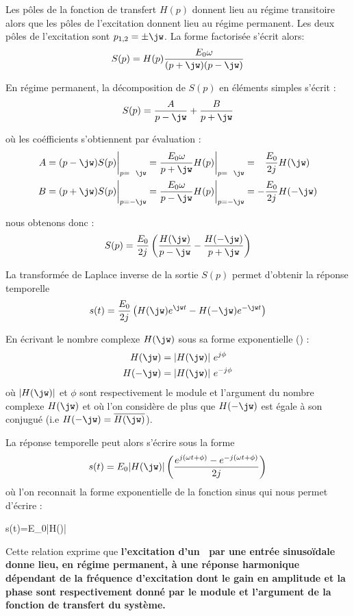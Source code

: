 Les pôles de la fonction de transfert $H(p)$ donnent lieu au 
régime transitoire alors que les pôles de l'excitation donnent 
lieu au régime permanent. 
Les deux pôles de l'excitation sont $p_{1,2}=\pm\jw$. La forme factorisée s'écrit alors:
$$
S(p)=H(p)\dfrac{E_0\omega}{(p+\jw)(p-\jw)}
$$

En régime permanent, la décomposition de $S(p)$ en éléments simples s'écrit :
$$
S(p)=\dfrac{A}{p-\jw} + \dfrac{B}{p+\jw}
$$

où les coéfficients s'obtiennent par évaluation :
\begin{align*}
    A&=(p-\jw)S(p)\bigg|_{p=\hphantom{-}\jw} =\dfrac{E_0\omega}{p+\jw}H(p)\bigg|_{p=\hphantom{-}\jw} =\hphantom{-}\dfrac{E_0}{2j}H(\jw)\\
    B&=(p+\jw)S(p)\bigg|_{p=-\jw}=\dfrac{E_0\omega}{p-\jw}H(p)\bigg|_{p=-\jw}=-\dfrac{E_0}{2j}H(-\jw)
\end{align*}

nous obtenons donc :
$$
S(p)=\dfrac{E_0}{2j}\left(\dfrac{H(\jw)}{p-\jw}-\dfrac{H(-\jw)}{p+\jw} \right)
$$

La transformée de Laplace inverse de la sortie $S(p)$ permet d'obtenir la réponse temporelle 
$$
s(t)=\dfrac{E_0}{2j}\left(H(\jw)e^{\jw t}-H(-\jw)e^{-\jw t}\right)
$$

En écrivant le nombre complexe $H(\jw)$ sous sa forme exponentielle () :
\begin{align*}
    H(\jw)  &= |H(\jw)| e^{j\phi} \\
    H(-\jw) &= |H(\jw)| e^{-j\phi}
\end{align*}
où $|H(\jw)|$ et $\phi$ sont respectivement le module et l'argument du nombre complexe $H(\jw)$ 
et où l'on considère de plus que $H(-\jw)$ est égale à son conjugué (i.e $H(-\jw)=\overline{H(\jw)}$).

La réponse temporelle peut alors s'écrire sous la forme 
\begin{align*}
    s(t)=E_0|H(\jw)|\left(\dfrac{e^{j(\omega t+\phi)}-e^{-j(\omega t+\phi)}}{2j}\right)
\end{align*}
où l'on reconnait la forme exponentielle de la fonction sinus qui nous permet d'écrire :
\begin{bequation}
    s(t)=E_0|H(\jw)|\label{eq-rh}
\end{bequation}

Cette relation exprime que \textbf{l'excitation d'un {}~par une entrée sinuso\"idale donne 
lieu, en régime permanent, à une réponse harmonique dépendant de la fréquence d'excitation dont 
le gain en amplitude et la phase sont respectivement donné par le module et l'argument de la fonction
de transfert du système.}

